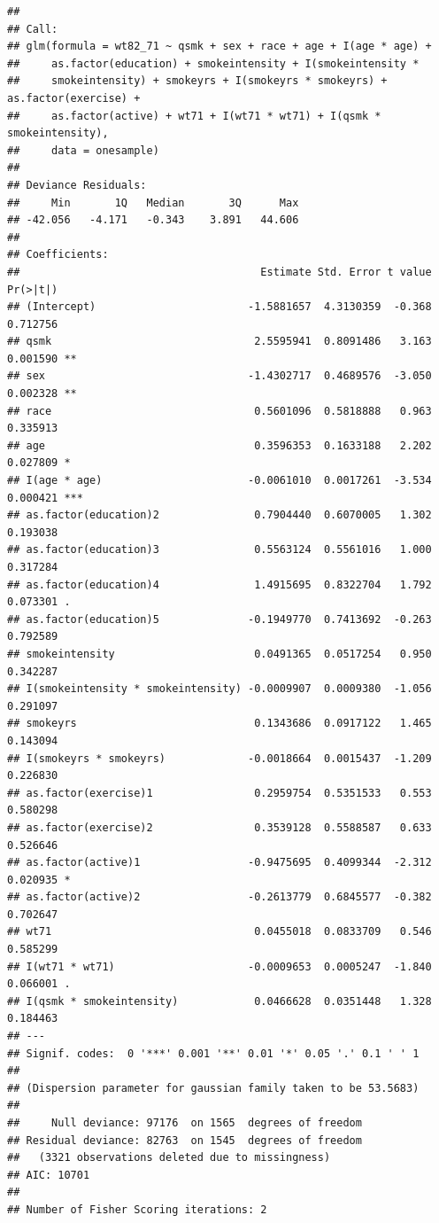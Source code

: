 \documentclass[
  10pt,
]{book}
\begin{document}
\begin{verbatim}
## 
## Call:
## glm(formula = wt82_71 ~ qsmk + sex + race + age + I(age * age) + 
##     as.factor(education) + smokeintensity + I(smokeintensity * 
##     smokeintensity) + smokeyrs + I(smokeyrs * smokeyrs) + as.factor(exercise) + 
##     as.factor(active) + wt71 + I(wt71 * wt71) + I(qsmk * smokeintensity), 
##     data = onesample)
## 
## Deviance Residuals: 
##     Min       1Q   Median       3Q      Max  
## -42.056   -4.171   -0.343    3.891   44.606  
## 
## Coefficients:
##                                      Estimate Std. Error t value Pr(>|t|)    
## (Intercept)                        -1.5881657  4.3130359  -0.368 0.712756    
## qsmk                                2.5595941  0.8091486   3.163 0.001590 ** 
## sex                                -1.4302717  0.4689576  -3.050 0.002328 ** 
## race                                0.5601096  0.5818888   0.963 0.335913    
## age                                 0.3596353  0.1633188   2.202 0.027809 *  
## I(age * age)                       -0.0061010  0.0017261  -3.534 0.000421 ***
## as.factor(education)2               0.7904440  0.6070005   1.302 0.193038    
## as.factor(education)3               0.5563124  0.5561016   1.000 0.317284    
## as.factor(education)4               1.4915695  0.8322704   1.792 0.073301 .  
## as.factor(education)5              -0.1949770  0.7413692  -0.263 0.792589    
## smokeintensity                      0.0491365  0.0517254   0.950 0.342287    
## I(smokeintensity * smokeintensity) -0.0009907  0.0009380  -1.056 0.291097    
## smokeyrs                            0.1343686  0.0917122   1.465 0.143094    
## I(smokeyrs * smokeyrs)             -0.0018664  0.0015437  -1.209 0.226830    
## as.factor(exercise)1                0.2959754  0.5351533   0.553 0.580298    
## as.factor(exercise)2                0.3539128  0.5588587   0.633 0.526646    
## as.factor(active)1                 -0.9475695  0.4099344  -2.312 0.020935 *  
## as.factor(active)2                 -0.2613779  0.6845577  -0.382 0.702647    
## wt71                                0.0455018  0.0833709   0.546 0.585299    
## I(wt71 * wt71)                     -0.0009653  0.0005247  -1.840 0.066001 .  
## I(qsmk * smokeintensity)            0.0466628  0.0351448   1.328 0.184463    
## ---
## Signif. codes:  0 '***' 0.001 '**' 0.01 '*' 0.05 '.' 0.1 ' ' 1
## 
## (Dispersion parameter for gaussian family taken to be 53.5683)
## 
##     Null deviance: 97176  on 1565  degrees of freedom
## Residual deviance: 82763  on 1545  degrees of freedom
##   (3321 observations deleted due to missingness)
## AIC: 10701
## 
## Number of Fisher Scoring iterations: 2
\end{verbatim}
\end{document}
